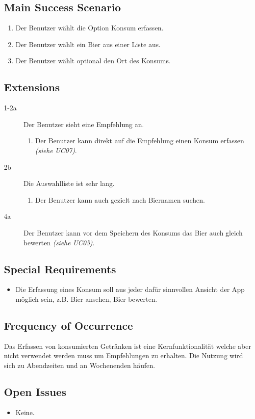 \documentclass[10pt,a4paper]{scrartcl}
\begin{document}
\subsection*{Main Success Scenario}

\begin{enumerate}
\item Der Benutzer wählt die Option Konsum erfassen.
\item Der Benutzer wählt ein Bier aus einer Liste aus.
\item Der Benutzer wählt optional den Ort des Konsums.
\end{enumerate}


\subsection*{Extensions}

\begin{description}
\item[1-2a] Der Benutzer sieht eine Empfehlung an.
	\begin{enumerate}
	\item Der Benutzer kann direkt auf die Empfehlung einen Konsum erfassen \textit{(siehe UC07)}.
	\end{enumerate}
\item[2b] Die Auswahlliste ist sehr lang.
	\begin{enumerate}
	\item Der Benutzer kann auch gezielt nach Biernamen suchen.
	\end{enumerate}
\item[4a] Der Benutzer kann vor dem Speichern des Konsums das Bier auch gleich bewerten \textit{(siehe UC05)}.
\end{description}


\subsection*{Special Requirements}

\begin{itemize}
\item Die Erfassung eines Konsum soll aus jeder dafür sinnvollen Ansicht der App möglich sein, z.B. Bier ansehen, Bier bewerten.
\end{itemize}



\subsection*{Frequency of Occurrence}

Das Erfassen von konsumierten Getränken ist eine Kernfunktionalität welche aber nicht verwendet werden muss um Empfehlungen zu erhalten. Die Nutzung wird sich zu Abendzeiten und an Wochenenden häufen.

\subsection*{Open Issues}

\begin{itemize}
\item Keine.
\end{itemize}
\end{document}
